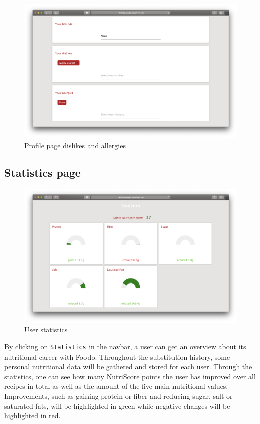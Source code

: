 \begin{figure}[H]
	\captionsetup{justification=centering}
	\begin{center}
		\includegraphics[scale=0.30]{Ressourcen/img/screenshots/screenshotP.png}
		\vspace{-2em}
		\caption{Profile page dislikes and allergies}
	\end{center}
\end{figure}

\subsection*{Statistics page}
\vspace{0.5em}
\begin{figure}[H]
	\captionsetup{justification=centering}
	\begin{center}
		\includegraphics[scale=0.30]{Ressourcen/img/screenshots/screenshotQ.png}
		\vspace{-3em}
		\caption{User statistics}
	\end{center}
\end{figure}
		\vspace{-2em}
By clicking on \texttt{Statistics} in the navbar, a user can get an overview about its nutritional career with Foodo. Throughout the substitution history, some personal nutritional data will be gathered and stored for each user. Through the statistics, one can see how many NutriScore points the user has improved over all recipes in total as well as the amount of the five main nutritional values. Improvements, such as gaining protein or fiber and reducing sugar, salt or saturated fats, will be highlighted in green while negative changes will be highlighted in red.

